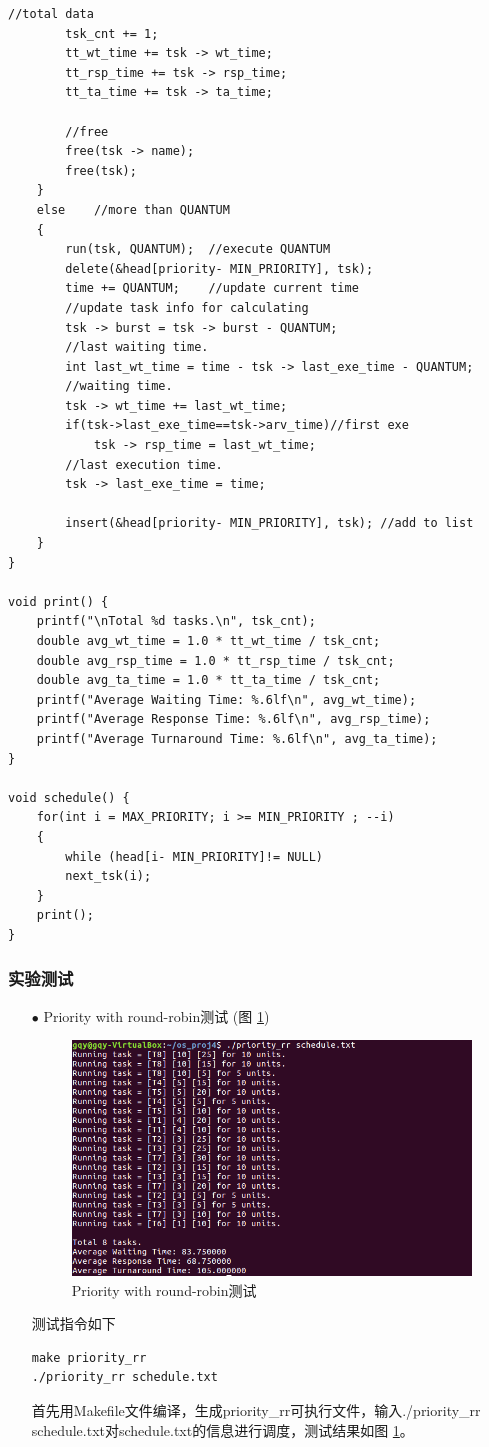 \documentclass{article}
\begin{document}
\begin{lstlisting}[language={[ANSI]C}]
		//total data
		tsk_cnt += 1;
		tt_wt_time += tsk -> wt_time;
		tt_rsp_time += tsk -> rsp_time;
		tt_ta_time += tsk -> ta_time;

		//free
		free(tsk -> name);
		free(tsk);
	}
	else	//more than QUANTUM
	{
		run(tsk, QUANTUM);	//execute QUANTUM
		delete(&head[priority- MIN_PRIORITY], tsk);
		time +=	QUANTUM;	//update current time
		//update task info for calculating
		tsk -> burst = tsk -> burst - QUANTUM;
		//last waiting time.
		int last_wt_time = time - tsk -> last_exe_time - QUANTUM;
		//waiting time.	
		tsk -> wt_time += last_wt_time;
		if(tsk->last_exe_time==tsk->arv_time)//first exe
			tsk -> rsp_time = last_wt_time;
		//last execution time.	
		tsk -> last_exe_time = time;
		
		insert(&head[priority- MIN_PRIORITY], tsk);	//add to list
	}
}

void print() {
	printf("\nTotal %d tasks.\n", tsk_cnt);
	double avg_wt_time = 1.0 * tt_wt_time / tsk_cnt;
	double avg_rsp_time = 1.0 * tt_rsp_time / tsk_cnt;
	double avg_ta_time = 1.0 * tt_ta_time / tsk_cnt;
	printf("Average Waiting Time: %.6lf\n", avg_wt_time);
	printf("Average Response Time: %.6lf\n", avg_rsp_time);
	printf("Average Turnaround Time: %.6lf\n", avg_ta_time);
}

void schedule() {
	for(int i = MAX_PRIORITY; i >= MIN_PRIORITY ; --i)
	{	
		while (head[i- MIN_PRIORITY]!= NULL)
		next_tsk(i);
	}
	print();
}
\end{lstlisting}
\subsubsection{实验测试}
\begin{itemize}
\item[$\bullet$]Priority with round-robin测试 (图 \ref{Priority with round-robin测试})
\begin{figure}[htbp]
		\centering
		\includegraphics{prr}
		\caption{Priority with round-robin测试} \label{Priority with round-robin测试}
\end{figure}

测试指令如下
\begin{lstlisting}[language={[ANSI]C}]
make priority_rr
./priority_rr schedule.txt
\end{lstlisting}
首先用Makefile文件编译，生成priority\_rr可执行文件，输入./priority\_rr schedule.txt对schedule.txt的信息进行调度，测试结果如图 \ref{Priority with round-robin测试}。
\end{itemize}
\end{document}
